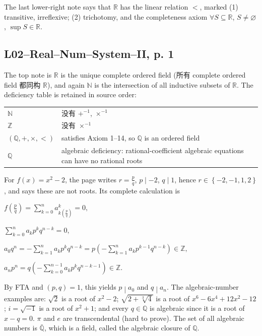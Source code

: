 The last lower-right note says that \(\mathbb{R}\) has the linear relation \(<\), marked (1) transitive, irreflexive; (2) trichotomy, and the completeness axiom \(\forall S \subseteq \mathbb{R}\), \(S \neq \varnothing\), \(\sup S \in \mathbb{R}\).

\subsection{L02--Real--Num--System--II, p. 1}

The top note is \(\mathbb{R}\) is the unique complete ordered field (所有 complete ordered field 都同构 \(\mathbb{R}\)), and again \(\mathbb{N}\) is the intersection of all inductive subsets of \(\mathbb{R}\). The deficiency table is retained in source order:

{\def\LTcaptype{none} %
\begin{longtable}[]{@{}ll@{}}
\toprule\noalign{}
\endhead
\bottomrule\noalign{}
\endlastfoot
\(\mathbb{N}\) & 没有 \(+^{- 1}\), \(\times^{- 1}\) \\
\(\mathbb{Z}\) & 没有 \(\times^{- 1}\) \\
\(\left( {\mathbb{Q}, + , \times , <} \right)\) & satisfies Axiom 1--14, so \(\mathbb{Q}\) is an ordered field \\
\(\mathbb{Q}\) & algebraic deficiency: rational-coefficient algebraic equations can have no rational roots \\
\end{longtable}
}

For \(f(x) = x^{2} - 2\), the page writes \(r = \frac{p}{q}\), \(\left. p \middle| - 2 \right.\), \(\left. q \middle| 1 \right.\), hence \(r \in \left\{ {- 2, - 1,1,2} \right\}\), and says these are not roots. Its complete calculation is

\(f\left( \frac{p}{q} \right) = \sum_{k = 0}^{n}a_{k{(\frac{p}{q})}}^{k} = 0,\)

\(\sum_{k = 0}^{n}a_{k}p^{k}q^{n - k} = 0,\)

\(a_{0}q^{n} = - \sum_{k = 1}^{n}a_{k}p^{k}q^{n - k} = p\left( {- \sum_{k = 1}^{n}a_{k}p^{k - 1}q^{n - k}} \right) \in \mathbb{Z},\)

\(a_{n}p^{n} = q\left( {- \sum_{k = 0}^{n - 1}a_{k}p^{k}q^{n - k - 1}} \right) \in \mathbb{Z}.\)

By FTA and \(\left( {p,q} \right) = 1\), this yields \(\left. p \middle| a_{0} \right.\) and \(\left. q \middle| a_{n} \right.\). The algebraic-number examples are: \(\sqrt{2}\) is a root of \(x^{2} - 2\); \(\sqrt{2 + \sqrt[3]{4}}\) is a root of \(x^{6} - 6x^{4} + 12x^{2} - 12\); \(i = \sqrt{- 1}\) is a root of \(x^{2} + 1\); and every \(q \in \mathbb{Q}\) is algebraic since it is a root of \(x - q = 0\). \(\pi\) and \(e\) are transcendental (hard to prove). The set of all algebraic numbers is \(\bar{\mathbb{Q}}\), which is a field, called the algebraic closure of \(\mathbb{Q}\).

